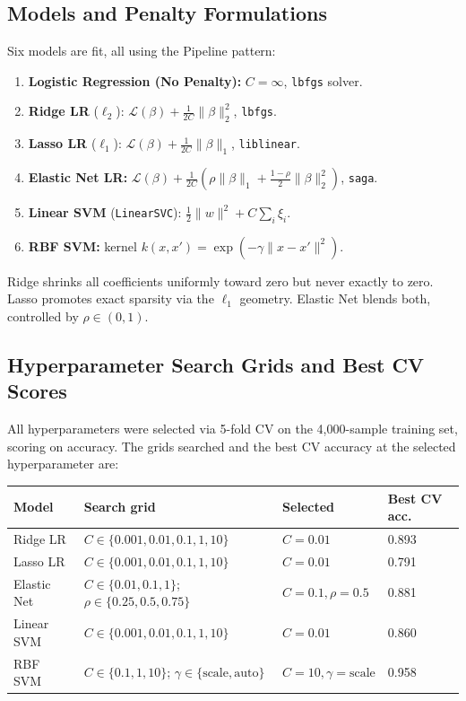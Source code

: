 \documentclass[10pt, letterpaper]{article}
\begin{document}
\subsection{Models and Penalty Formulations}
Six models are fit, all using the Pipeline pattern:
\begin{enumerate}
\item \textbf{Logistic Regression (No Penalty):} $C = \infty$, \texttt{lbfgs} solver.
\item \textbf{Ridge LR} ($\ell_2$): $\mathcal{L}(\beta) + \frac{1}{2C} \|\beta\|_2^2$, \texttt{lbfgs}.
\item \textbf{Lasso LR} ($\ell_1$): $\mathcal{L}(\beta) + \frac{1}{2C} \|\beta\|_1$, \texttt{liblinear}.
\item \textbf{Elastic Net LR:} $\mathcal{L}(\beta) + \frac{1}{2C}\left( \rho \|\beta\|_1 + \frac{1-\rho}{2} \|\beta\|_2^2 \right)$, \texttt{saga}.
\item \textbf{Linear SVM} (\texttt{LinearSVC}): $\frac{1}{2}\|w\|^2 + C \sum_i \xi_i$.
\item \textbf{RBF SVM:} kernel $k(x, x') = \exp(-\gamma \|x - x'\|^2)$.
\end{enumerate}

Ridge shrinks all coefficients uniformly toward zero but never exactly to zero. Lasso promotes exact sparsity via the $\ell_1$ geometry. Elastic Net blends both, controlled by $\rho \in (0, 1)$.

\subsection{Hyperparameter Search Grids and Best CV Scores}
All hyperparameters were selected via 5-fold CV on the 4{,}000-sample training set, scoring on accuracy. The grids searched and the best CV accuracy at the selected hyperparameter are:

\begin{center}\small
\renewcommand{\arraystretch}{1.2}
\begin{tabular}{@{}llll@{}}
\toprule
Model & Search grid & Selected & Best CV acc. \\
\midrule
Ridge LR & $C \in \{0.001, 0.01, 0.1, 1, 10\}$ & $C = 0.01$ & 0.893 \\
Lasso LR & $C \in \{0.001, 0.01, 0.1, 1, 10\}$ & $C = 0.01$ & 0.791 \\
Elastic Net & $C \in \{0.01, 0.1, 1\}$; $\rho \in \{0.25, 0.5, 0.75\}$ & $C = 0.1, \rho = 0.5$ & 0.881 \\
Linear SVM & $C \in \{0.001, 0.01, 0.1, 1, 10\}$ & $C = 0.01$ & 0.860 \\
RBF SVM & $C \in \{0.1, 1, 10\}$; $\gamma \in \{\text{scale}, \text{auto}\}$ & $C = 10, \gamma = \text{scale}$ & 0.958 \\
\bottomrule
\end{tabular}
\end{center}
\end{document}
